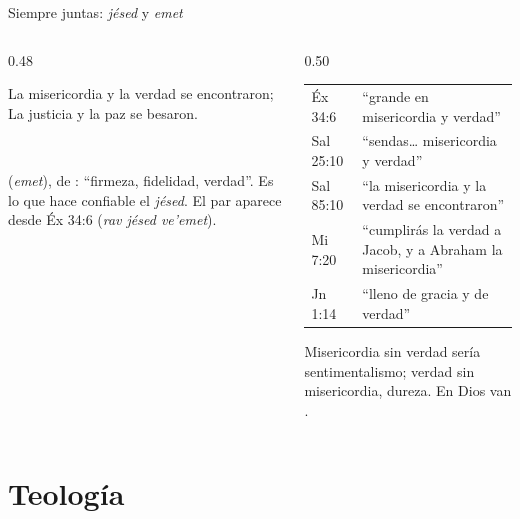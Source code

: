 \begin{frame}{Siempre juntas: \emph{jésed} y \emph{emet}}
\begin{columns}[c,onlytextwidth]
\begin{column}{0.48\textwidth}
\begin{cita}La misericordia y la verdad se encontraron; La justicia y la paz se besaron.\end{cita}
\begin{center}\\ \end{center}
\scriptsize{} (\emph{emet}), de : ``firmeza, fidelidad, verdad''. Es lo que hace confiable el \emph{jésed}. El par aparece desde Éx 34:6 (\emph{rav jésed ve'emet}).
\end{column}
\begin{column}{0.50\textwidth}
\scriptsize\renewcommand{\arraystretch}{1.15}
\begin{tabular}{@{}>{\RaggedRight\arraybackslash}p{1.5cm}>{\RaggedRight\arraybackslash}p{4.3cm}@{}}
\toprule
Éx 34:6 & ``grande en misericordia y verdad'' \\
Sal 25:10 & ``sendas\ldots{} misericordia y verdad'' \\
Sal 85:10 & ``la misericordia y la verdad se encontraron'' \\
Mi 7:20 & ``cumplirás la verdad a Jacob, y a Abraham la misericordia'' \\
Jn 1:14 & ``lleno de gracia y de verdad'' \\
\bottomrule
\end{tabular}\par\medskip
\small Misericordia sin verdad sería sentimentalismo; verdad sin misericordia, dureza. En Dios van .\par\smallskip
{}
\end{column}
\end{columns}
\end{frame}

\section{Teología}

